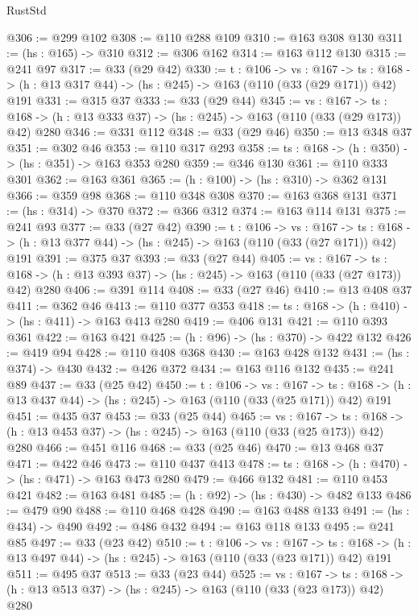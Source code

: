 \begin{lexlean}{RustStd}
\begin{coremodule}
{\begin{coremodule}
{{{{{@306 := @299 @102
@308 := @110 @288 @109
@310 := @163 @308 @130
@311 := (hs : @165) -> @310
@312 := @306 @162
@314 := @163 @112 @130
@315 := @241 @97
@317 := @33 (@29 @42)
@330 := {t : @106} ->
  {vs : @167} ->
  {ts : @168} -> (h : @13 @317 @44) -> (hs : @245) -> @163 (@110 (@33 (@29 @171)) @42) @191
@331 := @315 @37
@333 := @33 (@29 @44)
@345 := {vs : @167} ->
  {ts : @168} -> (h : @13 @333 @37) -> (hs : @245) -> @163 (@110 (@33 (@29 @173)) @42) @280
@346 := @331 @112
@348 := @33 (@29 @46)
@350 := @13 @348 @37
@351 := @302 @46
@353 := @110 @317 @293
@358 := {ts : @168} -> (h : @350) -> (hs : @351) -> @163 @353 @280
@359 := @346 @130
@361 := @110 @333 @301
@362 := @163 @361
@365 := (h : @100) -> (hs : @310) -> @362 @131
@366 := @359 @98
@368 := @110 @348 @308
@370 := @163 @368 @131
@371 := (hs : @314) -> @370
@372 := @366 @312
@374 := @163 @114 @131
@375 := @241 @93
@377 := @33 (@27 @42)
@390 := {t : @106} ->
  {vs : @167} ->
  {ts : @168} -> (h : @13 @377 @44) -> (hs : @245) -> @163 (@110 (@33 (@27 @171)) @42) @191
@391 := @375 @37
@393 := @33 (@27 @44)
@405 := {vs : @167} ->
  {ts : @168} -> (h : @13 @393 @37) -> (hs : @245) -> @163 (@110 (@33 (@27 @173)) @42) @280
@406 := @391 @114
@408 := @33 (@27 @46)
@410 := @13 @408 @37
@411 := @362 @46
@413 := @110 @377 @353
@418 := {ts : @168} -> (h : @410) -> (hs : @411) -> @163 @413 @280
@419 := @406 @131
@421 := @110 @393 @361
@422 := @163 @421
@425 := (h : @96) -> (hs : @370) -> @422 @132
@426 := @419 @94
@428 := @110 @408 @368
@430 := @163 @428 @132
@431 := (hs : @374) -> @430
@432 := @426 @372
@434 := @163 @116 @132
@435 := @241 @89
@437 := @33 (@25 @42)
@450 := {t : @106} ->
  {vs : @167} ->
  {ts : @168} -> (h : @13 @437 @44) -> (hs : @245) -> @163 (@110 (@33 (@25 @171)) @42) @191
@451 := @435 @37
@453 := @33 (@25 @44)
@465 := {vs : @167} ->
  {ts : @168} -> (h : @13 @453 @37) -> (hs : @245) -> @163 (@110 (@33 (@25 @173)) @42) @280
@466 := @451 @116
@468 := @33 (@25 @46)
@470 := @13 @468 @37
@471 := @422 @46
@473 := @110 @437 @413
@478 := {ts : @168} -> (h : @470) -> (hs : @471) -> @163 @473 @280
@479 := @466 @132
@481 := @110 @453 @421
@482 := @163 @481
@485 := (h : @92) -> (hs : @430) -> @482 @133
@486 := @479 @90
@488 := @110 @468 @428
@490 := @163 @488 @133
@491 := (hs : @434) -> @490
@492 := @486 @432
@494 := @163 @118 @133
@495 := @241 @85
@497 := @33 (@23 @42)
@510 := {t : @106} ->
  {vs : @167} ->
  {ts : @168} -> (h : @13 @497 @44) -> (hs : @245) -> @163 (@110 (@33 (@23 @171)) @42) @191
@511 := @495 @37
@513 := @33 (@23 @44)
@525 := {vs : @167} ->
  {ts : @168} -> (h : @13 @513 @37) -> (hs : @245) -> @163 (@110 (@33 (@23 @173)) @42) @280
}}}}}
\end{coremodule}}
\end{coremodule}
\end{lexlean}

